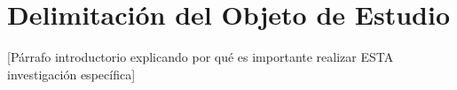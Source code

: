 %
%
%
%
%
%
%

\chapter{Delimitación del Objeto de Estudio}
\label{cap:delimitacion}


[Párrafo introductorio explicando por qué es importante realizar ESTA investigación específica]

